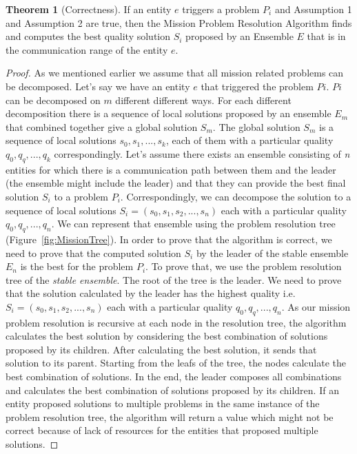 \documentclass[journal]{IEEEtran}
\theoremstyle{definition}
\newtheorem{theorem}{Theorem}
\begin{document}

\begin{theorem}[Correctness]
If an entity $e$ triggers a problem $P_i$ and Assumption 1 and Assumption 2 are true, then the Mission Problem Resolution Algorithm finds and computes the best quality solution $S_i$  proposed by an Ensemble $E$ that is in the communication range of the entity $e$.
\end{theorem}




\begin{proof}
As we mentioned earlier we assume that all mission related problems can be decomposed. Let's say we have an entity $e$ that triggered the problem $Pi$. $Pi$ can be decomposed on $m$ different different ways. For each different decomposition there is a sequence of local solutions proposed by an ensemble $E_m$  that combined together give a global solution $S_m$. The global solution $S_m$ is a sequence of local solutions $s_0, s_1, ..., s_k$, each of them with a particular quality $q_0, q_q, ..., q_k$ correspondingly. Let's assume there exists an ensemble consisting of \textit{n} entities for which there is a communication path between them and the leader (the ensemble might include the leader) and that they can provide the best final solution $S_i$ to a problem $P_i$. Correspondingly, we can decompose the solution to a sequence of local solutions $S_i=(s_0, s_1, s_2, ..., s_n)$ each with a particular quality  $q_0, q_q, ..., q_n$.  We can represent that ensemble using the problem resolution tree (Figure~\ref{fig:MissionTree}). 
In order to prove that the algorithm is correct, 
we need to prove that the computed solution $S_i$ by the leader of the stable ensemble $E_n$ is the best for the problem $P_i$.
To prove that, we use the problem resolution tree of the \textit{stable ensemble}. The root of the tree is the leader. We need to prove that the solution calculated by the leader has the highest quality i.e. $S_i=(s_0, s_1, s_2, ..., s_n)$ each with a particular quality  $q_0, q_q, ..., q_n$.  
As our mission problem resolution is recursive at 
each node in the resolution tree, the algorithm calculates the best solution by considering the best combination of solutions proposed by its children. After calculating the best solution, it sends that solution to its parent. Starting from the leafs of the tree, the nodes calculate the best combination of solutions. In the end, the leader composes all combinations and calculates the best combination of solutions proposed by its children. If an entity proposed solutions to multiple problems in the same instance of the problem resolution tree, the algorithm will return a value which might not be correct because of lack of resources for the entities that proposed multiple solutions.


\end{proof}
\end{document}
